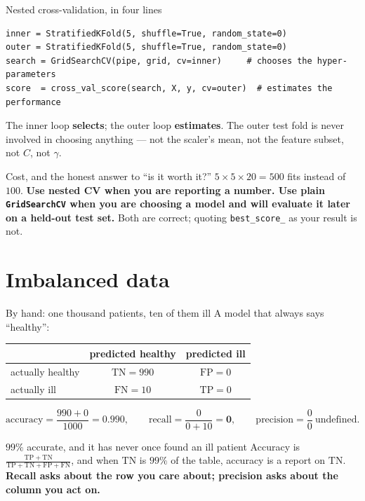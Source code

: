 \documentclass[aspectratio=169]{beamer}
\begin{document}
\begin{frame}[fragile,shrink=6]{Nested cross-validation, in four lines}
\begin{lstlisting}
inner = StratifiedKFold(5, shuffle=True, random_state=0)
outer = StratifiedKFold(5, shuffle=True, random_state=0)
search = GridSearchCV(pipe, grid, cv=inner)     # chooses the hyper-parameters
score  = cross_val_score(search, X, y, cv=outer)  # estimates the performance
\end{lstlisting}
\begin{center}\small
  The inner loop \textbf{selects}; the outer loop \textbf{estimates}. The
  outer test fold is never involved in choosing anything --- not the scaler's
  mean, not the feature subset, not $C$, not $\gamma$.
\end{center}
\begin{alertblock}{Cost, and the honest answer to ``is it worth it?''}
  \footnotesize $5 \times 5 \times 20 = 500$ fits instead of $100$.
  \textbf{Use nested CV when you are reporting a number. Use plain
  \texttt{GridSearchCV} when you are choosing a model and will evaluate it
  later on a held-out test set.} Both are correct; quoting
  \texttt{best\_score\_} as your result is not.
\end{alertblock}
\end{frame}

\section[Imbalance]{Imbalanced data}
\label{sec:imbal}

\begin{frame}[shrink=8]{By hand: one thousand patients, ten of them ill}
  A model that always says ``healthy'':
  \begin{center}\small
  \begin{tabular}{@{}lcc@{}}
    \toprule
    & predicted healthy & predicted ill\\
    \midrule
    actually healthy & $\mathrm{TN} = 990$ & $\mathrm{FP} = 0$\\
    actually ill     & $\mathrm{FN} = 10$  & $\mathrm{TP} = 0$\\
    \bottomrule
  \end{tabular}
  \end{center}
  \[
    \text{accuracy} = \frac{990 + 0}{1000} = \mathbf{0.990},
    \qquad
    \text{recall} = \frac{0}{0 + 10} = \mathbf{0}, \qquad
    \text{precision} = \frac{0}{0} \ \text{undefined}.
  \]
  \begin{alertblock}{$99\%$ accurate, and it has never once found an ill patient}
    \small Accuracy is $\frac{\mathrm{TP}+\mathrm{TN}}
    {\mathrm{TP}+\mathrm{TN}+\mathrm{FP}+\mathrm{FN}}$, and when
    $\mathrm{TN}$ is $99\%$ of the table, accuracy is a report on
    $\mathrm{TN}$. \textbf{Recall asks about the row you care about;
    precision asks about the column you act on.}
  \end{alertblock}
\end{frame}
\end{document}
